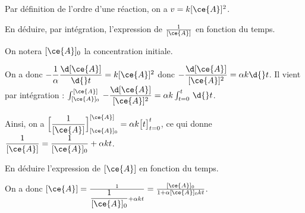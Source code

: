 
\begin{corrige}
Par définition de l'ordre d'une réaction, on a $v= k[\ce{A}]^2$.
\end{corrige}




\begin{enonce}
En déduire, par intégration, l'expression de $\frac{1}{[\ce{A}]}$ en fonction du temps. 

On notera $[\ce{A}]_0$ la concentration initiale.
\minusBigskip

\end{enonce}


\begin{corrige}
On a donc $-\dfrac{1}{\alpha} \dfrac{\d [\ce{A}]}{\d{}t} = k[\ce{A}]^2$ donc $-\dfrac{\d [\ce{A}]}{[\ce{A}]^2} = \alpha k\d{}t$. Il vient par intégration : $\int_{[\ce{A}]_0}^{[\ce{A}]} \, -\dfrac{\d [\ce{A}]}{[\ce{A}]^2} = \alpha k\int_{t=0}^{t} \, \d{}t$. 

Ainsi, on a $\Big[\dfrac{1}{[\ce{A}]}\Big]_{[\ce{A}]_0}^{[\ce{A}]} = \alpha k\bigl[t\bigl]_{t=0}^t$, ce qui donne $\dfrac{1}{[\ce{A}]} = \dfrac{1}{[\ce{A}]_0} + \alpha k t$.
\end{corrige}



\begin{enonce}
En déduire l'expression de $[\ce{A}]$ en fonction du temps.

\end{enonce}


\begin{corrige}
On a donc $[\ce{A}] 
= \frac{1}{\dfrac{1}{[\ce{A}]_0} + \alpha k t}
= \frac{[\ce{A}]_0}{1+\alpha [\ce{A}]_0 k t}$.
\end{corrige}



\finEntrainement



